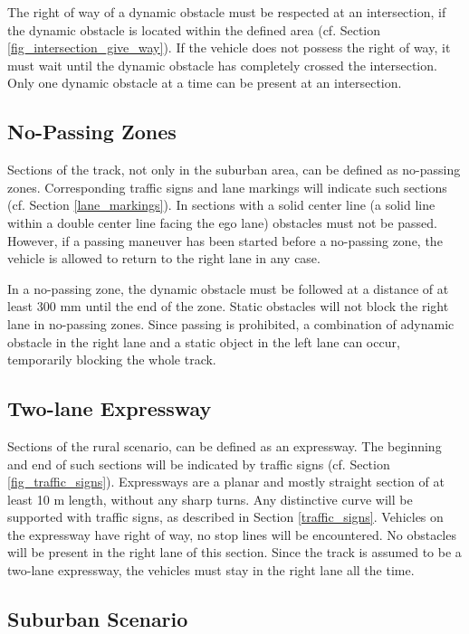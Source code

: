 \documentclass[a4paper]{report}
\begin{document}
{The right of way of a dynamic obstacle must be respected at an intersection, if the dynamic obstacle is located within the defined area (cf. Section \ref{fig_intersection_give_way}). If the vehicle does not possess the right of way, it must wait until the dynamic obstacle has completely crossed the intersection. Only one dynamic obstacle at a time can be present at an intersection. 


\subsection{No-Passing Zones}
\label{no_passing_zones}

Sections of the track, not only in the suburban area, can be defined as no-passing zones. Corresponding traffic signs and lane markings will indicate such sections (cf. Section \ref{lane_markings}). In sections with a solid center line (a solid line within a double center line facing the ego lane) obstacles must not be passed. However, if a passing maneuver has been started before a no-passing zone, the vehicle is allowed to return to the right lane in any case. 

In a no-passing zone, the dynamic obstacle must be followed at a distance of at least 300 mm until the end of the zone. Static obstacles will not block the right lane in no-passing zones. Since passing is prohibited, a combination of adynamic obstacle in the right lane and a static object in the left lane can occur, temporarily blocking the whole track. 

\subsection{Two-lane Expressway}

Sections of the rural scenario, can be defined as an expressway. The beginning and end of such sections will be indicated by traffic signs (cf. Section \ref{fig_traffic_signs}). Expressways are a planar and mostly straight section of at least 10 m length, without any sharp turns. Any distinctive curve will be supported with traffic signs, as described in Section \ref{traffic_signs}. Vehicles on the expressway have right of way, no stop lines will be encountered. No obstacles will be present in the right lane of this section. Since the track is assumed to be a two-lane expressway, the vehicles must stay in the right lane all the time.  

\subsection{Suburban Scenario}

}
\end{document}

